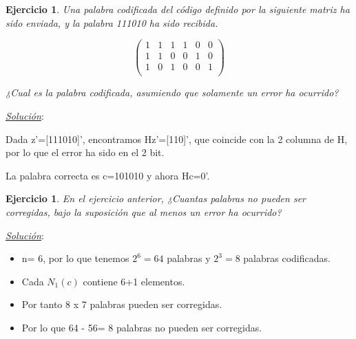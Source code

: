 \documentclass{beamer}
\theoremstyle{plain}
\theoremstyle{example}
\newtheorem{ejercicio} [Ejercicio]{Ejercicio}
\theoremstyle{example}
\begin{document}
\begin{frame}  \small \begin{ejercicio} 

Una palabra codificada del código definido por la siguiente matriz ha sido enviada, y la palabra 111010 ha sido recibida.

\[
        \left( \begin{array}{cccccc}
                      1 &   1   &   1  &    1 &   0  &   0  \\  
					  1 &   1   &   0  &    0 &   1  &   0	\\ 
					  1 &   0   &   1  &    0 &   0  &   1	\\
           			\end{array}
    		\right) 	    		
\]

¿Cual es la palabra codificada, asumiendo que solamente un error ha ocurrido?

\end{ejercicio} %
\textit{\underline{Solución}}:\\ 
\vspace{0.3cm}

Dada z'=[111010]', encontramos Hz'=[110]', que coincide con la 2 columna de H, por lo que el error ha sido en el 2 bit.

La palabra correcta es c=101010 y ahora Hc=0'.

 \end{frame} 


\begin{frame}  \small \begin{ejercicio} 

En el ejercicio anterior, ¿Cuantas palabras no pueden ser corregidas, bajo la suposición que al menos un error ha ocurrido?

\end{ejercicio} %
\textit{\underline{Solución}}:\\ 
\vspace{0.3cm}

\begin{itemize}
\item n= 6, por lo que tenemos $2^6=64$ palabras y $2^3=8$ palabras codificadas. 
\item Cada $N_1(c)$ contiene 6+1 elementos. 
\item Por tanto 8 x 7 palabras pueden ser corregidas.
\item Por lo que 64 - 56= 8 palabras no pueden ser corregidas.

\end{itemize}





\end{frame} 
\end{document}
